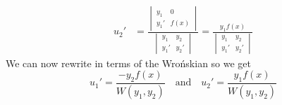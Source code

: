 \documentclass[notes]{subfiles}
\begin{document}
\begin{align*}
    u_2'
    &= \frac{\begin{vmatrix}
        y_1 & 0 \\
        y_1' & f(x)
    \end{vmatrix}}{\begin{vmatrix}
        y_1 & y_2 \\
        y_1' & y_2'
    \end{vmatrix}}
    = \frac{y_1f(x)}{\begin{vmatrix}
        y_1 & y_2 \\
        y_1' & y_2'
    \end{vmatrix}}
\end{align*}
We can now rewrite in terms of the Wro\'nskian so we get
\begin{equation} \label{var_params}
    u_1' = \frac{-y_2f(x)}{W(y_1, y_2)} \quad \text{and} \quad u_2' = \frac{y_1f(x)}{W(y_1, y_2)}
\end{equation}
\end{document}

